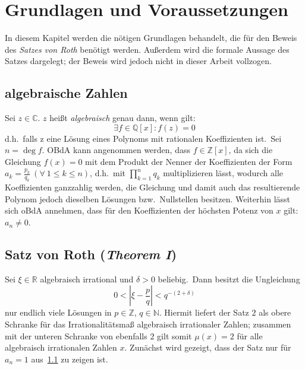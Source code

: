 
\section{Grundlagen und Voraussetzungen}
    \label{sec:basics}
    \textrm{In diesem Kapitel werden die nötigen Grundlagen behandelt, die für den Beweis des \emph{Satzes von Roth}
    benötigt werden. Außerdem wird die formale Aussage des Satzes dargelegt; der Beweis wird jedoch nicht in dieser
    Arbeit vollzogen.}
    
    \subsection{algebraische Zahlen}
        \label{subsec:algebraic-numbers}
        \textrm{Sei $z \in \mathbb{C}$. $z$ heißt \emph{algebraisch} genau dann, wenn gilt:}
        \begin{equation}
            \exists f \in \mathbb{Q}[x] : f(z) = 0 \label{eq:def-algebraic}
        \end{equation}
        \textrm{d.h.\ falls z eine Lösung eines Polynoms mit rationalen Koeffizienten ist.\ Sei $n = \deg f$. OBdA kann
        angenommen werden, dass $f \in \mathbb{Z}[x]$, da sich die Gleichung $f(x) = 0$ mit dem Produkt der Nenner der
        Koeffizienten der Form $a_k = \frac{p_k}{q_k} \ (\forall \  1 \leq k \leq n)$, d.h.\ mit $\prod_{k=1}^n q_k$
        multiplizieren lässt, wodurch alle Koeffizienten ganzzahlig werden, die Gleichung und damit auch das
        resultierende Polynom jedoch dieselben Lösungen bzw.\ Nullstellen besitzen.
        \newline
        Weiterhin lässt sich oBdA annehmen, dass für den Koeffizienten der höchsten Potenz von $x$ gilt: $a_n \neq 0$.}
    
    \subsection{Satz von Roth (\emph{Theorem I})}
        \label{subsec:th1}
        Sei $\xi \in \mathbb{R}$ algebraisch irrational und $\delta > 0$ beliebig.\ Dann besitzt die Ungleichung
        \begin{equation}
            0 < \left| \xi - \frac{p}{q} \right| < q^{-(2+\delta)} \label{eq:svr}
        \end{equation}
        \textrm{nur endlich viele Lösungen in $p \in \mathbb{Z}$, $q \in \mathbb{N}$.
        \newline
        \textrm{Hiermit liefert der Satz $2$ als obere Schranke für das Irrationalitätsmaß algebraisch irrationaler
        Zahlen; zusammen mit der unteren Schranke von ebenfalls $2$ gilt somit $\mu(x) = 2$ für alle algebraisch
        irrationalen Zahlen $x$.}
        \newline \newline
        Zunächst wird gezeigt, dass der Satz nur für $a_n = 1$ aus~\ref{subsec:algebraic-numbers} zu zeigen ist.}
    
